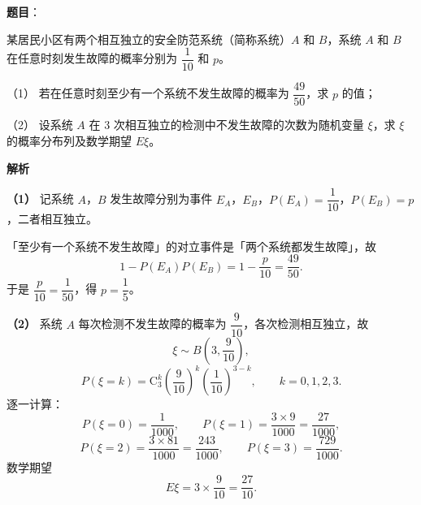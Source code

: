 \begin{answer}

\textbf{题目}：

某居民小区有两个相互独立的安全防范系统（简称系统）$A$ 和 $B$，系统 $A$ 和 $B$ 在任意时刻发生故障的概率分别为 $\dfrac1{10}$ 和 $p$。

（1） 若在任意时刻至少有一个系统不发生故障的概率为 $\dfrac{49}{50}$，求 $p$ 的值；

（2） 设系统 $A$ 在 $3$ 次相互独立的检测中不发生故障的次数为随机变量 $\xi$，求 $\xi$ 的概率分布列及数学期望 $E\xi$。

\textbf{解析}

\textbf{（1）} 记系统 $A$，$B$ 发生故障分别为事件 $E_A$，$E_B$，$P(E_A)=\dfrac1{10}$，$P(E_B)=p$，二者相互独立。

「至少有一个系统不发生故障」的对立事件是「两个系统都发生故障」，故
\nopagebreak[4]
\[1-P(E_A)P(E_B)=1-\frac p{10}=\frac{49}{50}.\]
于是 $\dfrac p{10}=\dfrac1{50}$，得 $p=\dfrac15$。

\textbf{（2）} 系统 $A$ 每次检测不发生故障的概率为 $\dfrac9{10}$，各次检测相互独立，故
\nopagebreak[4]
\[\xi\sim B\left(3,\frac9{10}\right),\]
\nopagebreak[4]
\[P(\xi=k)=\mathrm C_3^k\left(\frac9{10}\right)^k\left(\frac1{10}\right)^{3-k},\qquad k=0,1,2,3.\]
逐一计算：
\nopagebreak[4]
\[P(\xi=0)=\frac1{1000},\qquad P(\xi=1)=\frac{3\times9}{1000}=\frac{27}{1000},\]
\nopagebreak[4]
\[P(\xi=2)=\frac{3\times81}{1000}=\frac{243}{1000},\qquad P(\xi=3)=\frac{729}{1000}.\]
数学期望
\nopagebreak[4]
\[E\xi=3\times\frac9{10}=\frac{27}{10}.\]



\end{answer}
